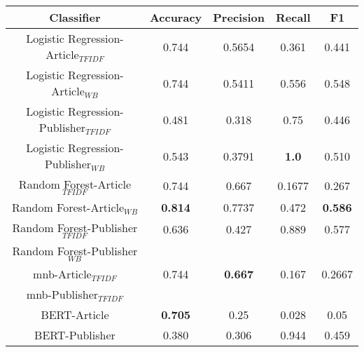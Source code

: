 \documentclass[a4paper, 11pt,titlepage,oneside,openany]{book}
\begin{document}
\begin{table}[h]
	\centering
	\begin{tabular}{c|c|c|c|c}
		\toprule
		Classifier & Accuracy & Precision & Recall &F1  \\
		\midrule
		Logistic Regression-Article$_{TFIDF}$ & 0.744 & 0.5654 & 0.361 & 0.441 \\
		Logistic Regression-Article$_{WB}$ & 0.744 & 0.5411 & 0.556 & 0.548 \\
		Logistic Regression-Publisher$_{TFIDF}$ & 0.481 & 0.318 & 0.75 & 0.446 \\
		Logistic Regression-Publisher$_{WB}$ & 0.543 & 0.3791 & \textbf{1.0} & 0.510 \\
		Random Forest-Article$_{TFIDF}$ & 0.744 & 0.667 & 0.1677 & 0.267 \\
		Random Forest-Article$_{WB}$ & \textbf{0.814} & 0.7737 & 0.472 & \textbf{0.586} \\
		Random Forest-Publisher$_{TFIDF}$ & 0.636 & 0.427 & 0.889 & 0.577 \\
		Random Forest-Publisher$_{WB}$ &  &  &  &  \\
		\gls{mnb}-Article$_{TFIDF}$ & 0.744 & \textbf{0.667} & 0.167 & 0.2667 \\
		\gls{mnb}-Publisher$_{TFIDF}$ &  &  &  &  \\
		BERT-Article & \textbf{0.705} & 0.25 & 0.028 & 0.05 \\
		BERT-Publisher & 0.380 & 0.306 & 0.944 & 0.459 \\
		\bottomrule
	\end{tabular}
\end{table}
\end{document}
